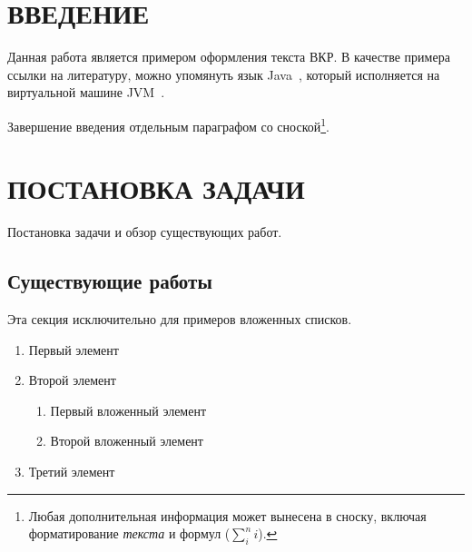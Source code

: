 





\renewcommand*\contentsname{СОДЕРЖАНИЕ}
{
\setcounter{tocdepth}{3}
\tableofcontents
}
\pagebreak

\section*{ВВЕДЕНИЕ}\label{sec:introduction}

Данная работа является примером оформления текста ВКР. В качестве
примера ссылки на литературу, можно упомянуть язык Java~\cite{gosling2000java},
который исполняется на виртуальной машине JVM~\cite{lindholm2014java}.

Завершение введения отдельным параграфом со сноской\footnote{Любая
  дополнительная информация может вынесена в сноску, включая
  форматирование \emph{текста} и формул (\(\sum_{i}^{n}{i}\)).}.

\clearpage
\pagebreak

\section{ПОСТАНОВКА ЗАДАЧИ}\label{sec:overview}

Постановка задачи и обзор существующих работ.

\subsection{Существующие работы}\label{sec:related-work}

Эта секция исключительно для примеров вложенных списков.

\begin{enumerate}
\def\labelenumi{\arabic{enumi}.}
\tightlist
\item
  Первый элемент
\item
  Второй элемент

  \begin{enumerate}
  \def\labelenumii{\arabic{enumii}.}
  \tightlist
  \item
    Первый вложенный элемент
  \item
    Второй вложенный элемент
  \end{enumerate}
\item
  Третий элемент
\end{enumerate}

